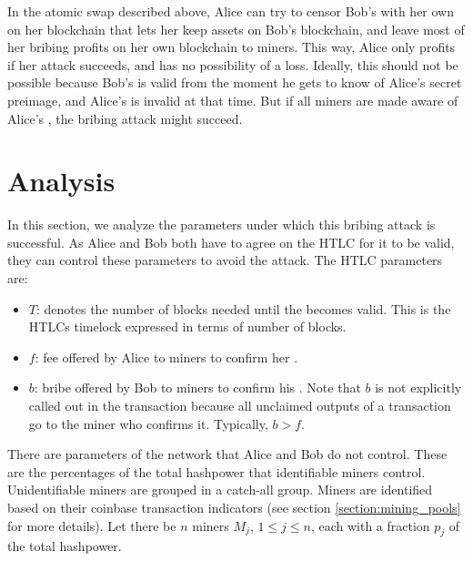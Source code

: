 In the atomic swap described above, Alice can try to censor Bob's \sellertxn{} with her own \bribetxn{} on her blockchain that lets her keep assets on Bob's blockchain, and leave most of her bribing profits on her own blockchain to miners. This way, Alice only profits if her attack succeeds, and has no possibility of a loss. Ideally, this should not be possible because Bob's \sellertxn{} is valid from the moment he gets to know of Alice's secret preimage, and Alice's \bribetxn{} is invalid at that time. But if all miners are made aware of Alice's \bribetxn{}, the bribing attack might succeed.

\section{Analysis}
In this section, we analyze the parameters under which this bribing attack is successful. As Alice and Bob both have to agree on the HTLC for it to be valid, they can control these parameters to avoid the attack. The HTLC parameters are:
\begin{itemize}
    \item $T$: denotes the number of blocks needed until the \bribetxn{} becomes valid. This is the HTLCs timelock expressed in terms of number of blocks.
    \item $f$: fee offered by Alice to miners to confirm her \sellertxn{}.
    \item $b$: bribe offered by Bob to miners to confirm his \bribetxn{}. Note that $b$ is not explicitly called out in the transaction because all unclaimed outputs of a transaction go to the miner who confirms it. Typically, $b > f$.
\end{itemize}
There are parameters of the network that Alice and Bob do not control. These are the percentages of the total hashpower that identifiable miners control. Unidentifiable miners are grouped in a catch-all group. Miners are identified based on their coinbase transaction indicators (see section \ref{section:mining_pools} for more details). Let there be $n$ miners $M_j$, $1\leq j \leq n$, each with a fraction $p_j$ of the total hashpower.

